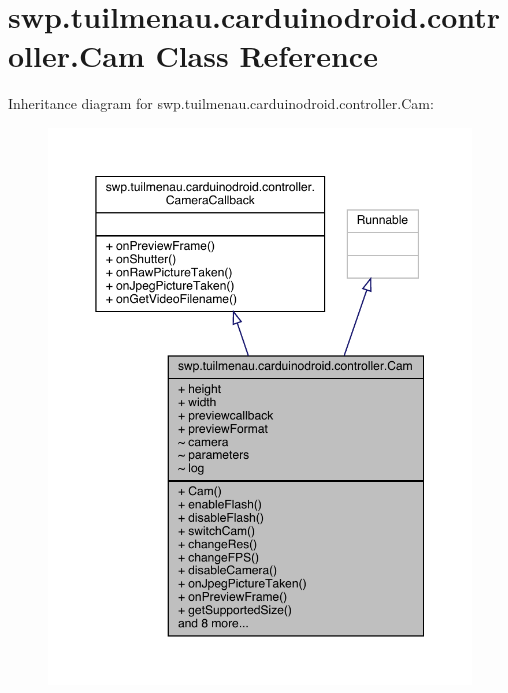 \hypertarget{classswp_1_1tuilmenau_1_1carduinodroid_1_1controller_1_1_cam}{}\section{swp.\+tuilmenau.\+carduinodroid.\+controller.\+Cam Class Reference}
\label{classswp_1_1tuilmenau_1_1carduinodroid_1_1controller_1_1_cam}


Inheritance diagram for swp.\+tuilmenau.\+carduinodroid.\+controller.\+Cam\+:
\nopagebreak
\begin{figure}[H]
\begin{center}
\leavevmode
\includegraphics[width=350pt]{classswp_1_1tuilmenau_1_1carduinodroid_1_1controller_1_1_cam__inherit__graph}
\end{center}
\end{figure}


